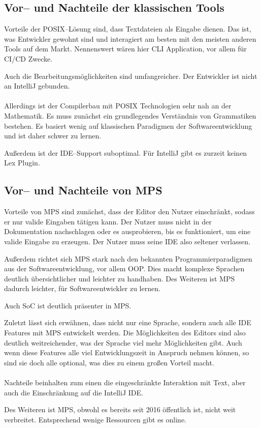 \subsection{Vor-- und Nachteile der klassischen Tools}\label{subsec:vor---und-nachteile-der-klassischen-tools}
Vorteile der \ac{POSIX}--Lösung sind, dass Textdateien als Eingabe dienen.
Das ist, was Entwickler gewohnt sind und interagiert am besten mit den meisten anderen Tools auf dem Markt.
Nennenswert wären hier \ac{CLI} Application, vor allem für \acs{CI}/\acs{CD} Zwecke.

Auch die Bearbeitungsmöglichkeiten sind umfangreicher.
Der Entwickler ist nicht an IntelliJ gebunden.

\paragraph*{}
Allerdings ist der Compilerbau mit \ac{POSIX} Technologien sehr nah an der Mathematik.
Es muss zunächst ein grundlegendes Verständnis von Grammatiken bestehen.
Es basiert wenig auf klassischen Paradigmen der Softwareentwicklung und ist daher schwer zu lernen.

Außerdem ist der \ac{IDE}--Support suboptimal.
Für IntelliJ gibt es zurzeit keinen Lex Plugin.

\subsection{Vor-- und Nachteile von \acs{MPS}}\label{subsec:vor---und-nachteile-von-mps}
Vorteile von \ac{MPS} sind zunächst, dass der Editor den Nutzer einschränkt, sodass er nur valide Eingaben tätigen kann.
Der Nutzer muss nicht in der Dokumentation nachschlagen oder es ausprobieren, bis es funktioniert, um eine valide Eingabe zu erzeugen.
Der Nutzer muss seine \ac{IDE} also seltener verlassen.

Außerdem richtet sich \ac{MPS} stark nach den bekannten Programmierparadigmen aus der Softwareentwicklung, vor allem \ac{OOP}.
Dies macht komplexe Sprachen deutlich übersichtlicher und leichter zu handhaben.
Des Weiteren ist \ac{MPS} dadurch leichter, für Softwareentwickler zu lernen.

Auch \ac{SoC} ist deutlich präsenter in \ac{MPS}.

Zuletzt lässt sich erwähnen, dass nicht nur eine Sprache, sondern auch alle \ac{IDE} Features mit \ac{MPS} entwickelt werden.
Die Möglichkeiten des Editors sind also deutlich weitreichender, was der Sprache viel mehr Möglichkeiten gibt.
Auch wenn diese Features alle viel Entwicklungszeit in Anspruch nehmen können, so sind sie doch alle optional, was dies zu einem großen Vorteil macht.

\paragraph*{}
Nachteile beinhalten zum einen die eingeschränkte Interaktion mit Text, aber auch die Einschränkung auf die IntelliJ \ac{IDE}.

Des Weiteren ist \ac{MPS}, obwohl es bereits seit 2016 öffentlich ist, nicht weit verbreitet.
Entsprechend wenige Ressourcen gibt es online.
